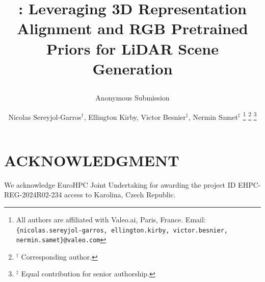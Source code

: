 \documentclass[letterpaper, 10 pt, conference]{ieeeconf}  %
\title{\LARGE \bf

\ours: Leveraging 3D Representation Alignment and RGB Pretrained Priors for LiDAR Scene Generation

}
\author{Anonymous Submission%
}
\author{Nicolas Sereyjol-Garros$^\dagger$, Ellington Kirby, Victor Besnier$^\ddagger$, Nermin Samet$^\ddagger$ %
\thanks{All authors are affiliated with Valeo.ai, Paris, France. Email: \texttt{\{nicolas.sereyjol-garros, ellington.kirby, victor.besnier, nermin.samet\}@valeo.com}
}
\thanks{$^\dagger$ Corresponding author.}
\thanks{$^\ddagger$ Equal contribution for senior authorship.}%
}
\begin{document}
\maketitle

    





\section*{ACKNOWLEDGMENT}
We acknowledge EuroHPC Joint Undertaking for awarding the project ID EHPC-REG-2024R02-234 access to Karolina, Czech Republic.

{
    \small
    
    
}
\end{document}
